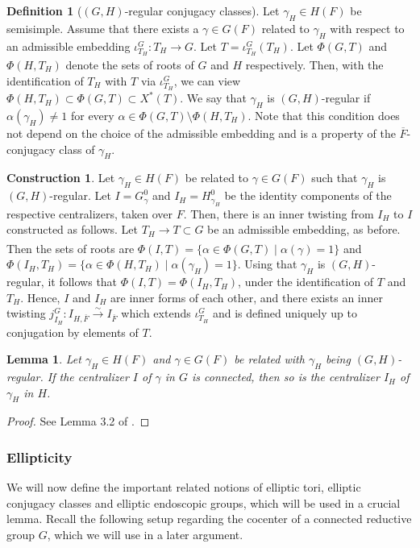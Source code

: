 \documentclass[11pt,a4paper]{article}
\theoremstyle{definition}
\newtheorem{D}[shared]{Definition}
\newtheorem{const}[shared]{Construction}
\theoremstyle{plain}
\newtheorem{Le}[shared]{Lemma}
\theoremstyle{remark}
\theoremstyle{plain}
\begin{document}
\begin{D}[$(G,H)$-regular conjugacy classes]\label{GH-regular}
    Let $\gamma_H \in H(F)$ be semisimple. Assume that there exists a $\gamma \in G(F)$ related to $\gamma_H$ with respect to an admissible embedding $\iota_{T_H}^G: T_H \xrightarrow[]{} G$. Let $T = \iota_{T_H}^G(T_H)$. Let $\Phi(G,T)$ and $\Phi(H,T_H)$ denote the sets of roots of $G$ and $H$ respectively. Then, with the identification of $T_H$ with $T$ via $\iota_{T_H}^G$, we can view $\Phi(H,T_H) \subset \Phi(G,T) \subset X^*(T)$. We say that $\gamma_H$ is $(G,H)$-regular if $\alpha(\gamma_H) \neq 1$ for every $\alpha \in \Phi(G,T) \setminus \Phi(H,T_H)$. Note that this condition does not depend on the choice of the admissible embedding and is a property of the $\overline{F}$-conjugacy class of $\gamma_H$.
\end{D}

\begin{const}\label{GHregular}
    Let $\gamma_H \in H(F)$ be related to $\gamma \in G(F)$ such that $\gamma_H$ is $(G,H)$-regular. Let $I = G_{\gamma}^0$ and $I_H = H_{\gamma_H}^0$ be the identity components of the respective centralizers, taken over $F$. Then, there is an inner twisting from $I_H$ to $I$ constructed as follows. Let $T_H \xrightarrow[]{} T \subset G$ be an admissible embedding, as before. Then the sets of roots are $\Phi(I,T) = \{\alpha \in \Phi(G,T) \mid \alpha(\gamma) = 1 \}$ and $\Phi(I_H, T_H) = \{ \alpha \in \Phi(H,T_H) \mid \alpha(\gamma_H) = 1 \}$. Using that $\gamma_H$ is $(G,H)$-regular, it follows that $\Phi(I,T) = \Phi (I_H, T_H)$, under the identification of $T$ and $T_H$. Hence, $I$ and $I_H$ are inner forms of each other, and there exists an inner twisting $j_{I_H}^G: I_{H,\overline{F}} \xrightarrow[]{\sim} I_{\overline{F}}$ which extends $\iota_{T_H}^G$ and is defined uniquely up to conjugation by elements of $T$.
\end{const}

\begin{Le}\label{connectedlemmaGHreg}
    Let $\gamma_H \in H(F)$ and $\gamma \in G(F)$ be related with $\gamma_H$ being $(G,H)$-regular. If the centralizer $I$ of $\gamma$ in $G$ is connected, then so is the centralizer $I_H$ of $\gamma_H$ in $H$.
\end{Le}
\begin{proof}
    See Lemma 3.2 of \cite{MR858284}.
\end{proof}

\subsubsection{Ellipticity}
We will now define the important related notions of elliptic tori, elliptic conjugacy classes and elliptic endoscopic groups, which will be used in a crucial lemma. Recall the following setup regarding the cocenter of a connected reductive group $G$, which we will use in a later argument.
\end{document}
